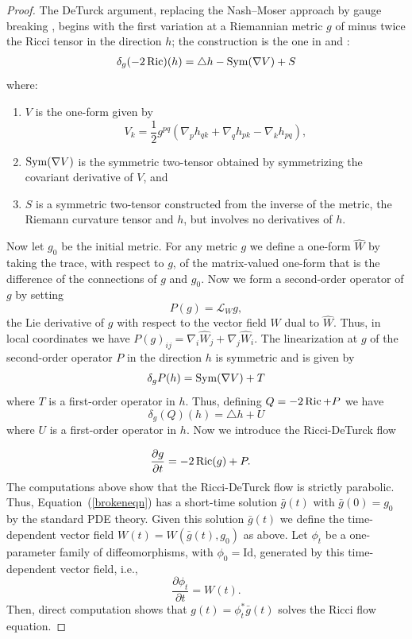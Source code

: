 \begin{proof}
\sketch The DeTurck argument, replacing the Nash--Moser approach
\cite{HamiltonIFTNM} by gauge breaking \cite{DeTurck}, begins with the first
variation at a Riemannian metric $g$ of minus twice the Ricci tensor in the direction $h$;
the construction is the one in \cite{DeTurck} and \cite{ChowKnopf}:
\begin{align*}
\delta_g(-2\operatorname{Ric})(h)=\triangle h-\operatorname{Sym}(\nabla V)+S
\end{align*}
where:
\begin{enumerate}
\item $V$ is the one-form given by
$$V_k=\frac{1}{2}g^{pq}(\nabla_ph_{qk}+\nabla_qh_{pk}-\nabla_kh_{pq}),$$
\item $\operatorname{Sym}(\nabla V)$ is the symmetric two-tensor obtained by
symmetrizing the covariant derivative of
$V$, and
\item  $S$ is a symmetric two-tensor constructed from the inverse of the metric,
the Riemann curvature tensor and $h$, but involves no derivatives of $h$.
\end{enumerate}

Now let $g_0$ be the initial metric. For any metric $g$ we define a one-form
$\hat W$ by taking the trace, with respect to $g$, of the matrix-valued
one-form that is the difference of the connections of $g$ and $g_0$. Now we
form a second-order operator of $g$ by setting
$$P(g)={\mathcal L}_Wg,$$
the Lie derivative of $g$ with respect to the vector field $W$ dual to $\hat
W$. Thus, in local coordinates we have
$P(g)_{ij}=\nabla_i\hat W_j+\nabla_j\hat W_i$.
The linearization at $g$ of the second-order operator $P$ in the direction
$h$ is symmetric and is given by
$$\delta_gP(h)=\operatorname{Sym}(\nabla V)+T$$
where $T$ is a first-order operator in $h$.
Thus, defining $Q=-2\operatorname{Ric}+P$ we have
$$\delta_g(Q)(h)=\triangle h+U$$
where $U$ is a first-order operator in $h$.
Now we introduce the Ricci-DeTurck  flow

\begin{align}\label{brokeneqn}
\frac{\partial g}{\partial t}&=-2\operatorname{Ric}(g)+P.
\end{align}
The computations above show that the Ricci-DeTurck flow is  strictly parabolic.
 Thus, Equation~(\ref{brokeneqn})  has a
short-time solution $\bar g(t)$ with $\bar g(0)=g_0$ by the standard PDE theory.
Given this solution $\bar g(t)$ we
define the time-dependent vector field $W(t)=W(\bar g(t),g_0)$ as above.
 Let $\phi_t$ be a one-parameter family of diffeomorphisms, with $\phi_0=\mathrm{Id}$,
generated by this time-dependent vector field, i.e.,
$$\frac{\partial\phi_t}{\partial t}=W(t).$$
Then, direct computation shows that $g(t)=\phi_t^*\bar g(t)$ solves the Ricci flow equation.
\end{proof}



